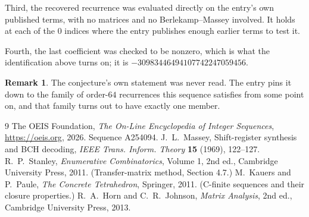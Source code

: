 \documentclass[11pt,a4paper]{article}
\theoremstyle{plain}
\theoremstyle{definition}
\newtheorem{remark}[theorem]{Remark}
\begin{document}
Third, the recovered recurrence was evaluated directly on the entry's own published terms, with
no matrices and no Berlekamp--Massey involved. It holds at each of the $0$ indices where
the entry publishes enough earlier terms to test it.

Fourth, the last coefficient was checked to be nonzero, which is what the identification above
turns on; it is $-30983446494107742247059456$.

\begin{remark}
The conjecture's own statement was never read. The entry pins it down to the family of
order-$64$ recurrences this sequence satisfies from some point on, and that family turns
out to have exactly one member.
\end{remark}

\begin{thebibliography}{9}
 The OEIS Foundation, \emph{The On-Line Encyclopedia of Integer
Sequences}, \url{https://oeis.org}, 2026. Sequence A254094.
 J.~L.~Massey, Shift-register synthesis and BCH decoding, \emph{IEEE
Trans. Inform. Theory} \textbf{15} (1969), 122--127.
 R.~P.~Stanley, \emph{Enumerative Combinatorics}, Volume 1, 2nd ed.,
Cambridge University Press, 2011. (Transfer-matrix method, Section 4.7.)
 M.~Kauers and P.~Paule, \emph{The Concrete Tetrahedron}, Springer, 2011.
(C-finite sequences and their closure properties.)
 R.~A.~Horn and C.~R.~Johnson, \emph{Matrix Analysis}, 2nd ed., Cambridge
University Press, 2013.
\end{thebibliography}
\end{document}
